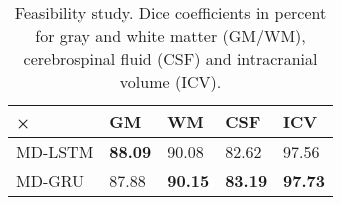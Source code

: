 \documentclass[varwidth=true, border=10pt, convert={size=640x}]{standalone}
\begin{document}
\begin{table}
\caption{Feasibility study. Dice coefficients in percent for gray and white matter (GM/WM), cerebrospinal fluid (CSF) and intracranial volume (ICV).}%
\begin{center}
\begin{tabular}{lllll}\toprule
× & GM & WM & CSF & ICV\\ \midrule
MD-LSTM  & \textbf{88.09}  & 90.08 & 82.62  & 97.56 \\ 
MD-GRU & 87.88 & \textbf{90.15 } & \textbf{83.19} & \textbf{97.73 }\\ \bottomrule
\end{tabular}
\label{feasibilityquantitative}
\end{center}
\end{table}
\end{document}
